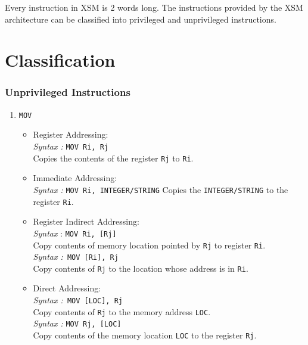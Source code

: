 \documentclass[11pt]{report}
\begin{document}
Every instruction in XSM is 2 words long. The instructions provided by the XSM architecture can be classified into privileged and unprivileged instructions.

\section{Classification}

\subsubsection{Unprivileged Instructions}

\begin{enumerate}
\item \texttt{MOV}
\begin{itemize}

\item Register Addressing:\\
\textit{Syntax :} \texttt{MOV Ri, Rj}\\
Copies the contents of the register \texttt{Rj} to \texttt{Ri}.

\item Immediate Addressing:\\
\textit{Syntax :} \texttt{MOV Ri, INTEGER/STRING}
Copies the \texttt{INTEGER/STRING} to the register \texttt{Ri}.


\item Register Indirect Addressing:\\
\textit{Syntax }: \texttt{MOV Ri, [Rj]}\\
Copy contents of memory location pointed by \texttt{Rj} to register \texttt{Ri}.\\
\textit{Syntax :}\texttt{ MOV [Ri], Rj} \\
Copy contents of \texttt{Rj} to the location whose address is in \texttt{Ri}.


\item Direct Addressing:\\
\textit{Syntax :}\texttt{ MOV [LOC], Rj}\\
Copy contents of \texttt{Rj}  to the memory address \texttt{LOC}.\\
\textit{Syntax :} \texttt{MOV Rj, [LOC]}\\
Copy contents of the memory location \texttt{LOC} to the register \texttt{Rj}.


\end{itemize}
\end{enumerate}
\end{document}
